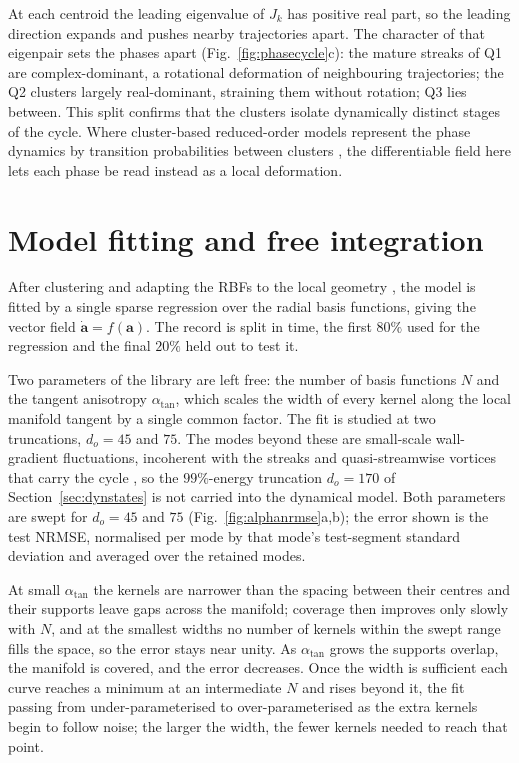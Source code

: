 \documentclass[pdflatex,sn-basic]{sn-jnl}
\newcommand{\bfa}{\bm{a}}
\theoremstyle{thmstyleone}%
\theoremstyle{thmstyletwo}%
\theoremstyle{thmstylethree}%
\begin{document}
At each centroid the leading eigenvalue of $J_k$ has positive real part, so the leading
direction expands and pushes nearby trajectories apart. The character of that eigenpair sets the
phases apart (Fig.~\ref{fig:phasecycle}c): the mature streaks of Q1 are complex-dominant,
a rotational deformation of neighbouring trajectories; the Q2 clusters largely real-dominant,
straining them without rotation; Q3 lies between.
This split confirms that the clusters isolate dynamically distinct stages of the cycle.
Where cluster-based reduced-order models represent the phase dynamics
by transition probabilities between clusters \citep{kaiser2014cluster,fernex2021cluster},
the differentiable field here lets each phase be read instead as a local deformation.




\section{Model fitting and free integration}\label{sec:recover}
After clustering and adapting the RBFs to the local geometry \citep{perezcuadrado2026manifold},
the model is fitted by a single sparse regression over the
radial basis functions, giving the vector field $\dot{\bfa} = f(\bfa)$. The record is split in
time, the first $80\%$ used for the regression and the final $20\%$ held out to test it.

Two
parameters of the library are left free: the number of basis functions $N$ and the tangent
anisotropy $\alpha_{\mathrm{tan}}$, which scales the width of every kernel along the local
manifold tangent by a single common factor. The fit is studied at two truncations, $d_o=45$ and $75$.
The modes beyond these are small-scale wall-gradient fluctuations, incoherent with the streaks
and quasi-streamwise vortices that carry the cycle
\citep{jimenez1991minimal,Hamilton_Kim_Waleffe_1995,Waleffe_1997}, so the $99\%$-energy
truncation $d_o=170$ of Section~\ref{sec:dynstates} is not carried into the dynamical model.
Both parameters are swept for $d_o=45$ and $75$ (Fig.~\ref{fig:alphanrmse}a,b); the error
shown is the test NRMSE, normalised per mode by that mode's test-segment standard deviation and
averaged over the retained modes.

At small $\alpha_{\mathrm{tan}}$ the kernels are narrower than the
spacing between their centres and their supports leave gaps across the manifold; coverage then
improves only slowly with $N$, and at the smallest widths no number of kernels within the swept
range fills the space, so the error stays near unity. As $\alpha_{\mathrm{tan}}$ grows the supports overlap, the
manifold is covered, and the error decreases. Once the width is sufficient each curve reaches a
minimum at an intermediate $N$ and rises beyond it, the fit passing from under-parameterised to
over-parameterised as the extra kernels begin to follow noise; the larger the width, the fewer
kernels needed to reach that point.
\end{document}
